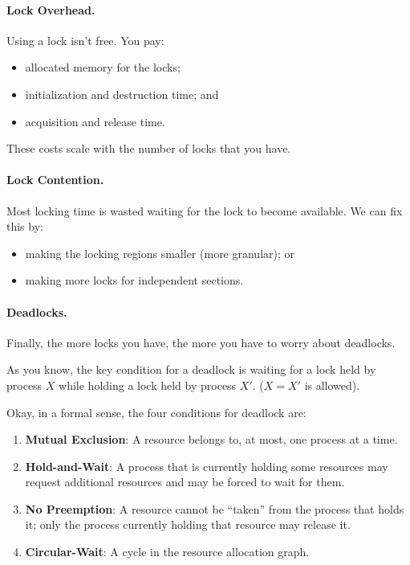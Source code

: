\documentclass[a4paper]{report}
\begin{document}
\paragraph{Lock Overhead.}
  Using a lock isn't free. You pay:
  \begin{itemize}
    \item allocated memory for the locks;
    \item initialization and destruction time; and
    \item acquisition and release time.
  \end{itemize}
  These costs scale with the number of locks that you have.

\paragraph{Lock Contention.}
 Most locking time is wasted waiting for the lock to become available.
We can fix this by:
      \begin{itemize}
        \item making the locking regions smaller (more granular); or
        \item making more locks for independent sections.
      \end{itemize}

\paragraph{Deadlocks.} Finally, the more locks you have, the more you have to worry about deadlocks.

As you know, the key condition for a deadlock is waiting for a lock held by process $X$ while holding a lock held by process $X'$. ($X = X'$ is allowed).

Okay, in a formal sense, the four conditions for deadlock are:

\begin{enumerate}
	\item \textbf{Mutual Exclusion}: A resource belongs to, at most, one process at a time.
	\item \textbf{Hold-and-Wait}: A process that is currently holding some resources may request additional resources and may be forced to wait for them.
	\item \textbf{No Preemption}: A resource cannot be ``taken'' from the process that holds it; only the process currently holding that resource may release it.
	\item \textbf{Circular-Wait}: A cycle in the resource allocation graph.
\end{enumerate}
\end{document}
